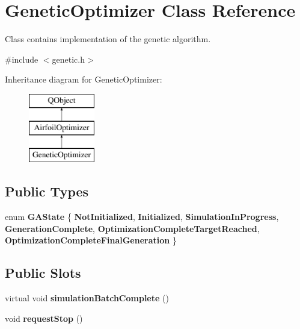 \hypertarget{class_genetic_optimizer}{}\section{Genetic\+Optimizer Class Reference}
\label{class_genetic_optimizer}


Class contains implementation of the genetic algorithm.  




{\ttfamily \#include $<$genetic.\+h$>$}

Inheritance diagram for Genetic\+Optimizer\+:\begin{figure}[H]
\begin{center}
\leavevmode
\includegraphics[height=3.000000cm]{class_genetic_optimizer}
\end{center}
\end{figure}
\subsection*{Public Types}
\begin{DoxyCompactItemize}
\item 
\mbox{\label{class_genetic_optimizer_aa91faeb519e387199da6988e60f4a135}} 
enum {\bfseries G\+A\+State} \{ \newline
{\bfseries Not\+Initialized}, 
{\bfseries Initialized}, 
{\bfseries Simulation\+In\+Progress}, 
{\bfseries Generation\+Complete}, 
\newline
{\bfseries Optimization\+Complete\+Target\+Reached}, 
{\bfseries Optimization\+Complete\+Final\+Generation}
 \}
\end{DoxyCompactItemize}
\subsection*{Public Slots}
\begin{DoxyCompactItemize}
\item 
\mbox{\label{class_genetic_optimizer_ad7fcac7f513d98f81eb91f27a5a20313}} 
virtual void {\bfseries simulation\+Batch\+Complete} ()
\item 
\mbox{\label{class_genetic_optimizer_ab8fc3a1363e8cc3eb2259354ee0d689a}} 
void {\bfseries request\+Stop} ()
\end{DoxyCompactItemize}
